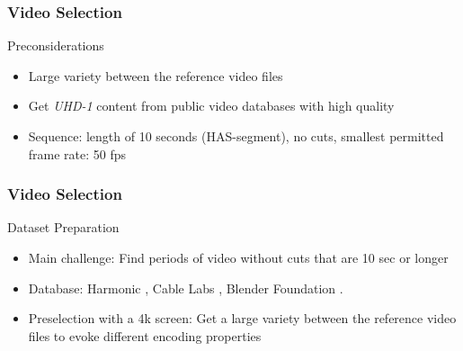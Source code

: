 \begin{frame}
\frametitle{Video Selection}
\large{Preconsiderations}

\begin{itemize}
\item Large variety between the reference video files
\item Get \textit{UHD-1} content from public video databases with high quality
\item Sequence: length of 10 seconds (HAS-segment), no cuts, smallest permitted frame rate: 50 fps
\end{itemize}

\end{frame}


\begin{frame}
\frametitle{Video Selection}
\large{Dataset Preparation}

\begin{itemize}
	
\item Main challenge: 
\newline Find periods of video without cuts that are 10 sec or longer
\item Database:
\newline Harmonic \cite{web:harmonic}, Cable Labs \cite{web:cablelabs}, Blender Foundation \cite{web:bbb}.
\item Preselection with a 4k screen:
\newline Get a large variety between the reference video files to evoke different encoding properties

\end{itemize}
\end{frame}


